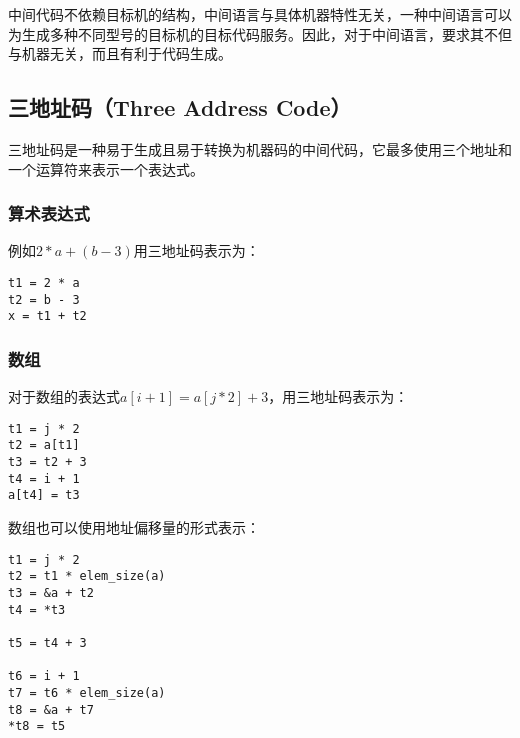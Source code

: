 中间代码不依赖目标机的结构，中间语言与具体机器特性无关，一种中间语言可以为生成多种不同型号的目标机的目标代码服务。因此，对于中间语言，要求其不但与机器无关，而且有利于代码生成。\\

\subsection{三地址码（Three Address Code）}

三地址码是一种易于生成且易于转换为机器码的中间代码，它最多使用三个地址和一个运算符来表示一个表达式。\\

\subsubsection{算术表达式}

例如$ 2 * a + (b - 3) $用三地址码表示为：

\vspace{-0.5cm}

\begin{lstlisting}
t1 = 2 * a
t2 = b - 3
x = t1 + t2
\end{lstlisting}

\vspace{0.5cm}

\subsubsection{数组}

对于数组的表达式$ a[i+1] = a[j*2] + 3 $，用三地址码表示为：

\vspace{-0.5cm}

\begin{lstlisting}
t1 = j * 2
t2 = a[t1]
t3 = t2 + 3
t4 = i + 1
a[t4] = t3
\end{lstlisting}

数组也可以使用地址偏移量的形式表示：

\vspace{-0.5cm}

\begin{lstlisting}
t1 = j * 2
t2 = t1 * elem_size(a)
t3 = &a + t2
t4 = *t3

t5 = t4 + 3

t6 = i + 1
t7 = t6 * elem_size(a)
t8 = &a + t7
*t8 = t5
\end{lstlisting}

\vspace{0.5cm}

